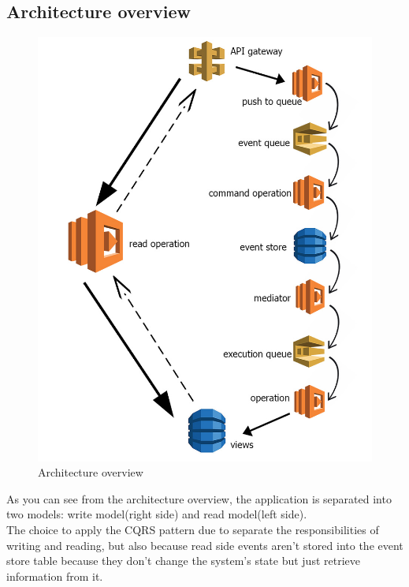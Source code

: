 \subsection{Architecture overview}
\begin{figure} [H]
	\centering
	\includegraphics[scale=0.55]{../Img/architecture}
	\caption{Architecture overview}\label{}
\end{figure}
As you can see from the architecture overview, the application is separated into two models: write model(right side) and read model(left side). \\
The choice to apply the CQRS pattern due to separate the responsibilities of writing and reading, but also because read side events aren't stored into the event store table because they don't change the system's state but just retrieve information from it.


